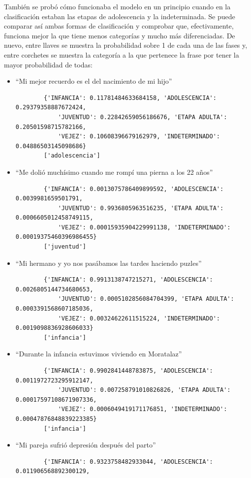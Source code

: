 También se probó cómo funcionaba el modelo en un principio cuando en la clasificación estaban las etapas de adolescencia y la indeterminada. Se puede comparar así ambas formas de clasificación y comprobar que, efectivamente, funciona mejor la que tiene menos categorías y mucho más diferenciadas. De nuevo, entre llaves se muestra la probabilidad sobre 1 de cada una de las fases y, entre corchetes se muestra la categoría a la que pertenece la frase por tener la mayor probabilidad de todas:

\begin{itemize}
	\item ``Mi mejor recuerdo es el del nacimiento de mi hijo''
	\begin{verbatim}
		{'INFANCIA': 0.11781484633684158, 'ADOLESCENCIA': 0.29379358887672424, 
			'JUVENTUD': 0.22842659056186676, 'ETAPA ADULTA': 0.20501598715782166, 
			'VEJEZ': 0.10608396679162979, 'INDETERMINADO': 0.04886503145098686}
		['adolescencia']
	\end{verbatim}
	\item ``Me dolió muchísimo cuando me rompí una pierna a los 22 años''
	\begin{verbatim}
		{'INFANCIA': 0.0013075786409899592, 'ADOLESCENCIA': 0.0039981659501791, 
			'JUVENTUD': 0.9936805963516235, 'ETAPA ADULTA': 0.0006605012458749115, 
			'VEJEZ': 0.00015935904229991138, 'INDETERMINADO': 0.00019375460396986455}
		['juventud']
	\end{verbatim}
	\item ``Mi hermano y yo nos pasábamos las tardes haciendo puzles''
	\begin{verbatim}
		{'INFANCIA': 0.9913138747215271, 'ADOLESCENCIA': 0.0026805144734680653, 
			'JUVENTUD': 0.0005102856084704399, 'ETAPA ADULTA': 0.0003391568607185036, 
			'VEJEZ': 0.00324622611515224, 'INDETERMINADO': 0.0019098836928606033}
		['infancia']
	\end{verbatim}
	\item ``Durante la infancia estuvimos viviendo en Moratalaz''
	\begin{verbatim}
		{'INFANCIA': 0.9902841448783875, 'ADOLESCENCIA': 0.0011972723295912147, 
			'JUVENTUD': 0.007258791010826826, 'ETAPA ADULTA': 0.00017597108671907336, 
			'VEJEZ': 0.0006049419171176851, 'INDETERMINADO': 0.00047876848839223385}
		['infancia']
	\end{verbatim}
	\item ``Mi pareja sufrió depresión después del parto''
	\begin{verbatim}
		{'INFANCIA': 0.9323758482933044, 'ADOLESCENCIA': 0.011906568892300129, 

\end{verbatim}
\end{itemize}
